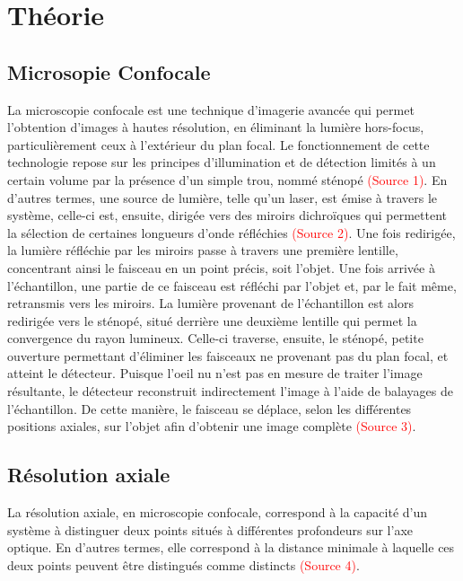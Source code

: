 \documentclass[11pt,letterpaper]{article}
\begin{document}
\section{Théorie}
\subsection{Microsopie Confocale}
La microscopie confocale est une technique d'imagerie avancée qui permet l'obtention d'images à hautes résolution, en éliminant la lumière hors-focus, particulièrement ceux à l'extérieur du plan focal. Le fonctionnement de cette technologie repose sur les principes d'illumination et de détection limités à un certain volume par la présence d'un simple trou, nommé sténopé \textcolor{red}{(Source 1)}. En d'autres termes, une source de lumière, telle qu'un laser, est émise à travers le système, celle-ci est, ensuite, dirigée vers des miroirs dichroïques qui permettent la sélection de certaines longueurs d'onde réfléchies \textcolor{red}{(Source 2)}. Une fois redirigée, la lumière réfléchie par les miroirs passe à travers une première lentille, concentrant ainsi le faisceau en un point précis, soit l'objet. Une fois arrivée à l'échantillon, une partie de ce faisceau est réfléchi par l'objet et, par le fait même, retransmis vers les miroirs. La lumière provenant de l'échantillon est alors redirigée vers le sténopé, situé derrière une deuxième lentille qui permet la convergence du rayon lumineux. Celle-ci traverse, ensuite, le sténopé, petite ouverture permettant d'éliminer les faisceaux ne provenant pas du plan focal, et atteint le détecteur. Puisque l'oeil nu n'est pas en mesure de traiter l'image résultante, le détecteur reconstruit indirectement l'image à l'aide de balayages de l'échantillon. De cette manière, le faisceau se déplace, selon les différentes positions axiales, sur l'objet afin d'obtenir une image complète \textcolor{red}{(Source 3)}.


\subsection{Résolution axiale}
La résolution axiale, en microscopie confocale, correspond à la capacité d'un système à distinguer deux points situés à différentes profondeurs sur l'axe optique. En d'autres termes, elle correspond à la distance minimale à laquelle ces deux points peuvent être distingués comme distincts \textcolor{red}{(Source 4)}.
\end{document}
